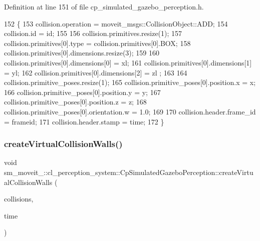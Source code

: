 Definition at line 151 of file cp\+\_\+simulated\+\_\+gazebo\+\_\+perception.\+h.


\begin{DoxyCode}
152             \{
153                 collision.operation = moveit\_msgs::CollisionObject::ADD;
154                 collision.id = id;
155 
156                 collision.primitives.resize(1);
157                 collision.primitives[0].type = collision.primitives[0].BOX;
158                 collision.primitives[0].dimensions.resize(3);
159 
160                 collision.primitives[0].dimensions[0] = xl;
161                 collision.primitives[0].dimensions[1] = yl;
162                 collision.primitives[0].dimensions[2] = zl ;
163 
164                 collision.primitive\_poses.resize(1);
165                 collision.primitive\_poses[0].position.x = x;
166                 collision.primitive\_poses[0].position.y = y;
167                 collision.primitive\_poses[0].position.z = z;
168                 collision.primitive\_poses[0].orientation.w = 1.0;
169 
170                 collision.header.frame\_id = frameid;
171                 collision.header.stamp = time;
172             \}
\end{DoxyCode}
\mbox{\label{classsm__moveit__4_1_1cl__perception__system_1_1CpSimulatedGazeboPerception_a07c208d7fdcd61338f941bf5620a09ec}} 
\subsubsection{\texorpdfstring{create\+Virtual\+Collision\+Walls()}{createVirtualCollisionWalls()}}
{\footnotesize\ttfamily void sm\+\_\+moveit\+\_\+::cl\+\_\+perception\+\_\+system\+::\+Cp\+Simulated\+Gazebo\+Perception\+::create\+Virtual\+Collision\+Walls (\begin{DoxyParamCaption}\item[{std\+::vector$<$ moveit\+\_\+msgs\+::\+Collision\+Object $>$ \&}]{collisions,  }\item[{ros\+::\+Time}]{time }\end{DoxyParamCaption})\hspace{0.3cm}{\ttfamily [inline]}}



